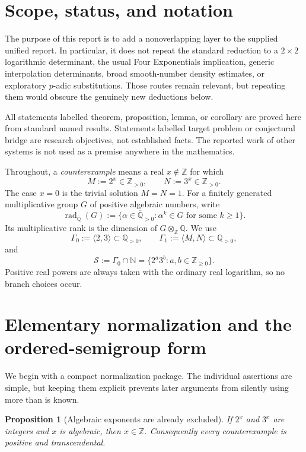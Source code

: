 \documentclass[11pt]{article}
\newtheorem{proposition}[theorem]{Proposition}
\theoremstyle{definition}
\newcommand{\Q}{\mathbb{Q}}
\newcommand{\Z}{\mathbb{Z}}
\newcommand{\N}{\mathbb{N}}
\newcommand{\Qbar}{\overline{\mathbb{Q}}}
\newcommand{\rad}{\operatorname{rad}}
\newcommand{\smooth}{\mathcal{S}}
\newcommand{\Gammao}{\Gamma_0}
\newcommand{\Gammai}{\Gamma_1}
\begin{document}
\tableofcontents

\section{Scope, status, and notation}

The purpose of this report is to add a nonoverlapping layer to the supplied
unified report.  In particular, it does not repeat the standard reduction to a
$2\times2$ logarithmic determinant, the usual Four Exponentials implication,
generic interpolation determinants, broad smooth-number density estimates,
or exploratory $p$-adic substitutions.  Those routes remain relevant, but
repeating them would obscure the genuinely new deductions below.

All statements labelled theorem, proposition, lemma, or corollary are proved
here from standard named results.  Statements labelled target problem or
conjectural bridge are research objectives, not established facts.  The
reported work of other systems is not used as a premise anywhere in the
mathematics.

Throughout, a \emph{counterexample} means a real $x\notin\Z$ for which
\[
        M:=2^x\in\Z_{>0},\qquad N:=3^x\in\Z_{>0}.
\]
The case $x=0$ is the trivial solution $M=N=1$.  For a finitely generated
multiplicative group $G$ of positive algebraic numbers, write
\[
 \rad_{\Qbar}(G)
 :=\{\alpha\in\Qbar_{>0}:\alpha^k\in G
       \text{ for some }k\geq1\}.
\]
Its multiplicative rank is the dimension of $G\otimes_{\Z}\Q$.  We use
\[
  \Gammao:=\langle2,3\rangle\subset\Q_{>0},\qquad
  \Gammai:=\langle M,N\rangle\subset\Q_{>0},
\]
and
\[
  \smooth:=\Gammao\cap\N=\{2^a3^b:a,b\in\Z_{\geq0}\}.
\]
Positive real powers are always taken with the ordinary real logarithm, so no
branch choices occur.

\section{Elementary normalization and the ordered-semigroup form}

We begin with a compact normalization package.  The individual assertions are
simple, but keeping them explicit prevents later arguments from silently using
more than is known.

\begin{proposition}[Algebraic exponents are already excluded]
\label{prop:alg-exponent}
If $2^x$ and $3^x$ are integers and $x$ is algebraic, then $x\in\Z$.
Consequently every counterexample is positive and transcendental.
\end{proposition}
\end{document}
